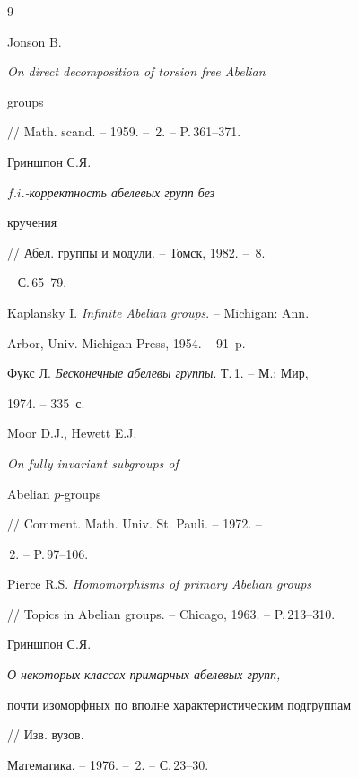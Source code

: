 \begin{thebibliography}{9}







Jonson B. {\it On direct decomposition of torsion free Abelian


groups\/} // Math. scand. -- 1959. -- \No\,2. -- P.\,361--371.




Гриншпон С.Я. {\it $f.i.$-корректность абелевых групп без


кручения\/} // Абел. группы и модули. -- Томск, 1982. -- \No\,8.


-- С.\,65--79.




Kaplansky I. {\it Infinite Abelian groups}. -- Michigan: Ann.


Arbor, Univ. Michigan Press, 1954. -- 91~p.




Фукс Л. {\em Бесконечные абелевы группы}. Т.\,1. -- М.: Мир,


1974. -- 335~с.




Moor D.J., Hewett E.J. {\it On fully invariant subgroups of


Abelian $p$-groups} // Comment. Math. Univ. St. Pauli. -- 1972. --


\No\,2. -- P.\,97--106.




Pierce R.S. {\it Homomorphisms of primary Abelian groups}


// Topics in Abelian groups. -- Chicago, 1963. -- P.\,213--310.




Гриншпон С.Я. {\it О некоторых классах примарных абелевых групп,


почти изоморфных по вполне характеристическим подгруппам} // Изв. вузов.


Математика. -- 1976. -- \No\,2. -- С.\,23--30.





\end{thebibliography}





\vskip 2cm














\label{end}





